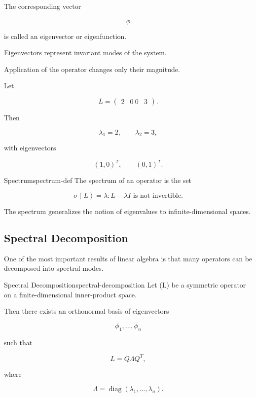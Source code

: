 \documentclass[12pt,twoside,openright]{book}
\newenvironment{ex}
{\begin{example}{}{}}
{\end{example}}
\begin{document}
The corresponding vector

\[
\phi
\]

is called an eigenvector or eigenfunction.

Eigenvectors represent invariant modes of the system.

Application of the operator changes only their magnitude.

\begin{ex}
Let

\[
L=
\begin{pmatrix}
2&0\
0&3
\end{pmatrix}.
\]

Then

\[
\lambda_1=2,
\qquad
\lambda_2=3,
\]

with eigenvectors

\[
(1,0)^T,
\qquad
(0,1)^T.
\]
\end{ex}

\begin{definition}{Spectrum}{spectrum-def}
The spectrum of an operator is the set

\[
\sigma(L)
=

{\lambda:L-\lambda I
\text{ is not invertible}}.
\]
\end{definition}

The spectrum generalizes the notion of eigenvalues to
infinite-dimensional spaces.

\subsection{Spectral Decomposition}

One of the most important results of linear algebra is
that many operators can be decomposed into spectral modes.

\begin{theorem}{Spectral Decomposition}{spectral-decomposition}
Let (L) be a symmetric operator on a finite-dimensional
inner-product space.

Then there exists an orthonormal basis of eigenvectors

\[
{\phi_1,\ldots,\phi_n}
\]

such that

\[
L
=

Q\Lambda Q^T,
\]

where

\[
\Lambda
=

\operatorname{diag}
(\lambda_1,\ldots,\lambda_n).
\]
\end{theorem}
\end{document}
